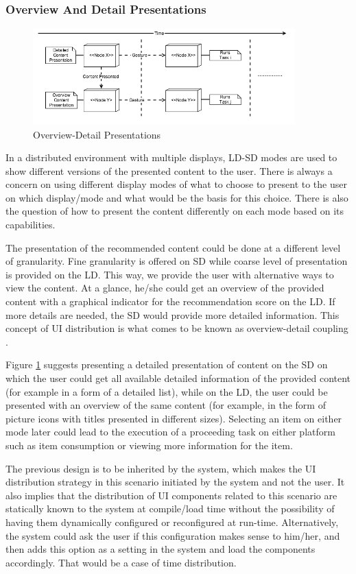 \subsubsection{Overview And Detail Presentations}
\begin{figure}[!htpb]
\includegraphics[width=0.9\textwidth, center, center]{figures/generic3}
\caption{Overview-Detail Presentations}
\label{fig:figure33}
\end{figure}
In a distributed environment with multiple displays, LD-SD modes are used to show different versions of the presented content to the user. There is always a concern on using different display modes of what to choose to present to the user on which display/mode and what would be the basis for this choice. There is also the question of how to present the content differently on each mode based on its capabilities.\par
The presentation of the recommended content could be done at a different level
of granularity. Fine granularity is offered on SD while coarse level of
presentation is provided on the LD. This way, we provide the user with
alternative ways to view the content. At a glance, he/she could get an overview
of the provided content with a graphical indicator for the recommendation score
on the LD. If more details are needed, the SD would provide more  detailed
information. This concept of UI distribution is what comes to be known as
overview-detail coupling \cite{kaviani2011dual}.\par
Figure \ref{fig:figure33} suggests presenting a detailed presentation  of content on the SD on which the user could get all available detailed information of the provided content (for example in a form of a detailed list), while on the LD, the user could be presented with an overview of the same content (for example, in the form of picture icons with titles presented in different sizes). Selecting an item on either mode later could lead to the execution of a proceeding task on either platform such as item consumption or viewing more information for the item.\par      
The previous design is to be inherited by the system, which makes the UI distribution strategy in this scenario initiated by the system and not the user. It also implies that the distribution of UI components related to this scenario are statically known to the system at compile/load time without the possibility of having them dynamically configured or reconfigured at run-time. Alternatively, the system could ask the user if this configuration makes sense to him/her, and then adds this option as a setting in the system and load the components accordingly. That would be a case of time distribution. 
